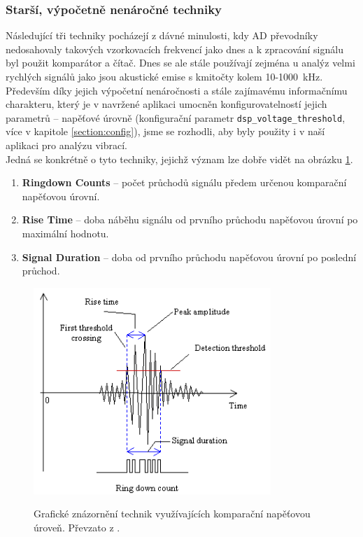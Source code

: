     \subsubsection{Starší, výpočetně nenáročné techniky}
        
        Následující tři techniky pocházejí z dávné minulosti, kdy AD převodníky nedosahovaly takových vzorkovacích frekvencí jako dnes a k zpracování signálu byl použit komparátor a čítač. Dnes se ale stále používají zejména u analýz velmi rychlých signálů jako jsou akustické emise s kmitočty kolem 10-1000~kHz. Především díky jejich výpočetní nenáročnosti a stále zajímavému informačnímu charakteru, který je v navržené aplikaci umocněn konfigurovatelností jejich parametrů – napěťové úrovně (konfigurační parametr \texttt{dsp\_voltage\_threshold}, více v kapitole \ref{section:config}), jsme se rozhodli, aby byly použity i v naší aplikaci pro analýzu vibrací.\\
        Jedná se konkrétně o tyto techniky, jejichž význam lze dobře vidět na obrázku \ref{figure:burst}.
       
        \begin{enumerate}
            \item \textbf{Ringdown Counts} – počet průchodů signálu předem určenou komparační napěťovou úrovní.
            \item \textbf{Rise Time} – doba náběhu signálu od prvního průchodu napěťovou úrovní po maximální hodnotu.
            \item \textbf{Signal Duration} – doba od prvního průchodu napěťovou úrovní po poslední průchod.
        \end{enumerate}{}
        
        \begin{figure} [!h]
            \centering
            \caption{Grafické znázornění technik využívajících komparační napěťovou úroveň. Převzato z \cite{website:8}.}
            \includegraphics[width=0.8\textwidth]{DSP/Figs/burst.png}
            \label{figure:burst}
        \end{figure} 
        
